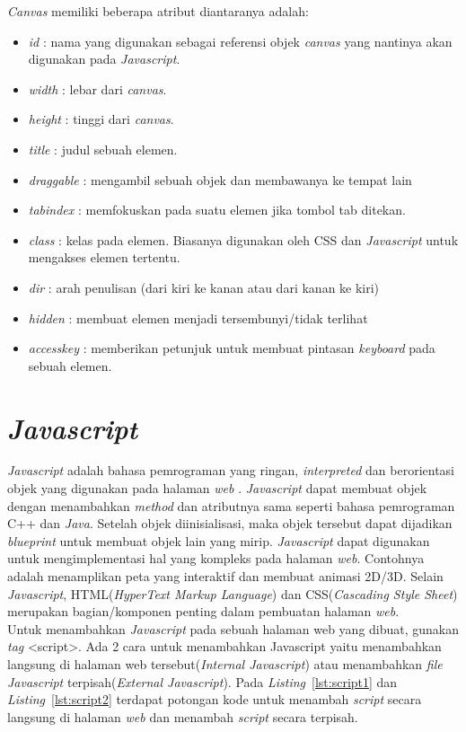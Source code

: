 \textit{Canvas} memiliki beberapa atribut diantaranya adalah: 
\begin{itemize}
	\item \textit{id} : nama yang digunakan sebagai referensi objek \textit{canvas} yang nantinya akan digunakan pada \textit{Javascript}.
	\item \textit{width} : lebar dari \textit{canvas}.
	\item \textit{height} : tinggi dari \textit{canvas}.
	\item \textit{title} : judul sebuah elemen.
	\item \textit{draggable} : mengambil sebuah objek dan membawanya ke tempat lain
	\item \textit{tabindex} : memfokuskan pada suatu elemen jika tombol tab ditekan.
	\item \textit{class} : kelas pada elemen. Biasanya digunakan oleh CSS dan \textit{Javascript} untuk mengakses elemen tertentu.
	\item \textit{dir} : arah penulisan (dari kiri ke kanan atau dari kanan ke kiri)
	\item \textit{hidden} : membuat elemen menjadi tersembunyi/tidak terlihat
	\item \textit{accesskey} : memberikan petunjuk untuk membuat pintasan \textit{keyboard} pada sebuah elemen.
\end{itemize}


\section{\textit{Javascript}}
\label{sec:Javascript}
\textit{Javascript} adalah bahasa pemrograman yang ringan, \textit{interpreted} dan berorientasi objek yang digunakan pada halaman \textit{web} \cite{MDN:05:Web}. \textit{Javascript} dapat membuat objek dengan menambahkan \textit{method} dan atributnya sama seperti bahasa pemrograman C++ dan \textit{Java}. Setelah objek diinisialisasi, maka objek tersebut dapat dijadikan \textit{blueprint} untuk membuat objek lain yang mirip. \textit{Javascript} dapat digunakan untuk mengimplementasi hal yang kompleks pada halaman \textit{web}. Contohnya adalah menamplikan peta yang interaktif dan membuat animasi 2D/3D. Selain \textit{Javascript}, HTML(\textit{HyperText Markup Language}) dan CSS(\textit{Cascading Style Sheet}) merupakan bagian/komponen penting dalam pembuatan halaman \textit{web}.\\

Untuk menambahkan \textit{Javascript} pada sebuah halaman web yang dibuat, gunakan \textit{tag} <script>. Ada 2 cara untuk menambahkan Javascript yaitu menambahkan langsung di halaman web tersebut(\textit{Internal Javascript}) atau menambahkan \textit{file Javascript} terpisah(\textit{External Javascript}). Pada \textit{Listing}~\ref{lst:script1} dan \textit{Listing}~\ref{lst:script2} terdapat potongan kode untuk menambah \textit{script} secara langsung di halaman \textit{web} dan menambah \textit{script} secara terpisah.

